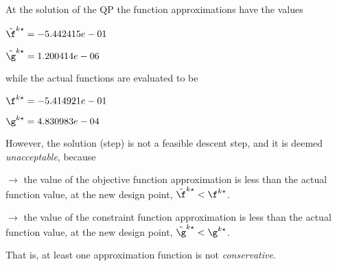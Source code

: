 At the solution of the QP the function approximations have the values

$\tilde \f^{k\star} = -5.442415e-01$

$\tilde \g^{k\star} =  1.200414e-06$

\bigskip
while the actual functions are evaluated to be

$\f^{k\star} = -5.414921e-01$

$\g^{k\star} =  4.830983e-04$

\bigskip
 However, the solution (step)                         is not a feasible descent step, and it is deemed                         \emph{unacceptable}, because 
 
$\to$ the value of the objective                             function approximation is less than the actual function                             value, at the new design point,                             $\tilde {\f}^{k\star} < {\f}^{k\star}$.

 $\to$ the value of the constraint function                             approximation is less than the actual function value, at                             the new design point, $\tilde {\g}^{k\star} < {\g}^{k\star}$.

 \bigskip 

 That is, at least one approximation                         function is not \emph{conservative}.
